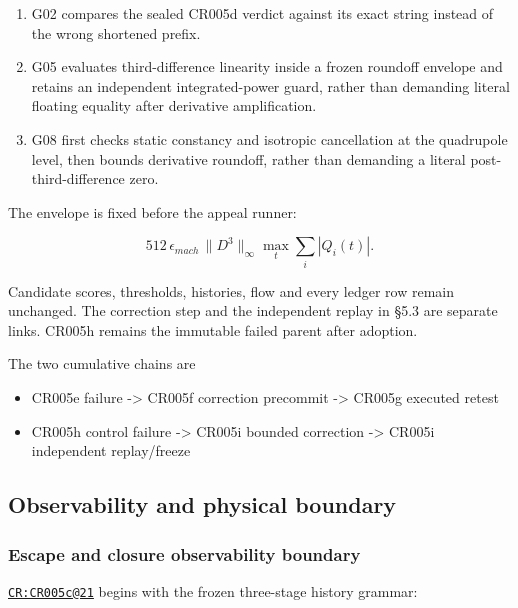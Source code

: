 \begin{enumerate}
\def\labelenumi{\arabic{enumi}.}
\tightlist
\item
  G02 compares the sealed CR005d verdict against its exact string
  instead of the wrong shortened prefix.
\item
  G05 evaluates third-difference linearity inside a frozen roundoff
  envelope and retains an independent integrated-power guard, rather
  than demanding literal floating equality after derivative
  amplification.
\item
  G08 first checks static constancy and isotropic cancellation at the
  quadrupole level, then bounds derivative roundoff, rather than
  demanding a literal post-third-difference zero.
\end{enumerate}

The envelope is fixed before the appeal runner:

\[
512\,\epsilon_{mach}\,\|D^3\|_\infty
\max_t\sum_i|Q_i(t)|.
\]

Candidate scores, thresholds, histories, flow and every ledger row
remain unchanged. The correction step and the independent replay in §5.3
are separate links. CR005h remains the immutable failed parent after
adoption.

The two cumulative chains are

\begin{itemize}
\tightlist
\item
  CR005e failure -\textgreater{} CR005f correction precommit
  -\textgreater{} CR005g executed retest
\item
  CR005h control failure -\textgreater{} CR005i bounded correction
  -\textgreater{} CR005i independent replay/freeze
\end{itemize}

\subsection{Observability and physical
boundary}\label{viii-ch08-observability-and-physical-boundary}

\subsubsection{Escape and closure observability
boundary}\label{viii-ch08-escape-and-closure-observability-boundary}

\href{https://github.com/iwtbotiwtwot/SAMA/blob/4c2b5dc1649da5900c90b90d0ce56c223dbb7717/tests/courtroom/21-gravitational-waves-cr005c-starbreaker-escape-closure-observability-gate/README.md}{\texttt{CR:CR005c@21}}
begins with the frozen three-stage history grammar:

